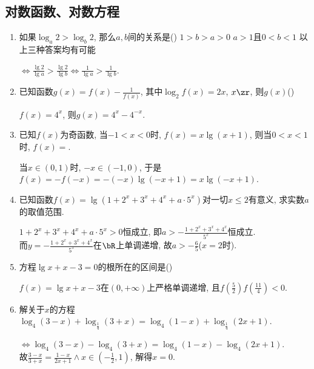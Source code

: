 \subsection*{对数函数、对数方程}
\begin{enumerate}
    \item 如果$\log_a2>\log_b2$, 那么$a,b$间的关系是\dotfill() 
    {$1>b>a>0$}
    {$a>1$且$0<b<1$}
    {以上三种答案均有可能}
    \begin{jieda}
    $\iff\frac{\lg2}{\lg{a}}>\frac{\lg2}{\lg{b}}\iff\frac{1}{\lg{a}}>\frac{1}{\lg{b}}$. 
    \end{jieda}
    \item 已知函数$g(x)=f(x)-\frac{1}{f(x)}$, 其中$\log_2f(x)=2x$, $x\zr$, 则$g(x)$\dotfill()
    \begin{jieda}
    $f(x)=4^x$, 则$g(x)=4^x-4^{-x}$. 
    \end{jieda}
    \item 已知$f(x)$为奇函数, 当$-1<x<0$时, $f(x)=x\lg(x+1)$, 则当$0<x<1$时, $f(x)=$. 
    \begin{jieda}
    当$x\in(0,1)$时, $-x\in(-1,0)$, 于是$f(x)=-f(-x)=-(-x)\lg(-x+1)=x\lg(-x+1)$. 
    \end{jieda}
    \item 已知函数$f(x)=\lg(1+2^x+3^x+4^x+a\cdot5^x)$对一切$x\leq 2$有意义, 求实数$a$的取值范围. 
    \begin{jieda}
    $1+2^x+3^x+4^x+a\cdot5^x>0$恒成立, 即$a>-\frac{1+2^x+3^x+4^x}{5^x}$恒成立. \\
    而$y=-\frac{1+2^x+3^x+4^x}{5^x}$在$\bR$上单调递增, 故$a>-\frac{6}{5}$($x=2$时). 
    \end{jieda}
    \item 方程$\lg{x}+x-3=0$的根所在的区间是\dotfill()
    \begin{jieda}
    $f(x)=\lg{x}+x-3$在$(0,+\infty)$上严格单调递增, 且$f(\frac{5}{2})f(\frac{11}{4})<0$. 
    \end{jieda}
    \item 解关于$x$的方程$\log_4(3-x)+\log_{\frac{1}{4}}(3+x)=\log_4(1-x)+\log_{\frac{1}{4}}(2x+1)$. 
    \begin{jieda}
    $\iff\log_4(3-x)-\log_4(3+x)=\log_4(1-x)-\log_4(2x+1)$. \\
    故$\frac{3-x}{3+x}=\frac{1-x}{2x+1}\land x\in(-\frac{1}{2},1)$, 解得$x=0$. 

\end{jieda}
\end{enumerate}
